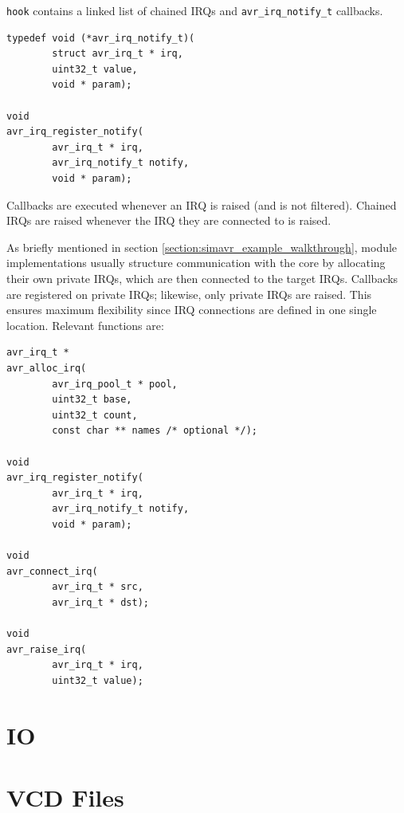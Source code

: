 \lstinline|hook| contains a linked list of chained \acp{IRQ} and
\lstinline|avr_irq_notify_t| callbacks.

\begin{lstlisting}
typedef void (*avr_irq_notify_t)(
        struct avr_irq_t * irq,
        uint32_t value,
        void * param);

void
avr_irq_register_notify(
        avr_irq_t * irq,
        avr_irq_notify_t notify,
        void * param);
\end{lstlisting}

Callbacks are executed whenever an \ac{IRQ} is raised (and is not filtered).
Chained \acp{IRQ} are raised whenever the \ac{IRQ} they are connected to is raised.

As briefly mentioned in section \ref{section:simavr_example_walkthrough}, module
implementations usually structure communication with the \simavr core by
allocating their own private \acp{IRQ}, which are then connected to the target
\simavr \acp{IRQ}. Callbacks are registered on private \acp{IRQ};
likewise, only private \acp{IRQ} are raised. This
ensures maximum flexibility since \ac{IRQ} connections are defined in one single
location. Relevant functions are:

\begin{lstlisting}
avr_irq_t *
avr_alloc_irq(
        avr_irq_pool_t * pool,
        uint32_t base,
        uint32_t count,
        const char ** names /* optional */);

void
avr_irq_register_notify(
        avr_irq_t * irq,
        avr_irq_notify_t notify,
        void * param);

void
avr_connect_irq(
        avr_irq_t * src,
        avr_irq_t * dst);

void
avr_raise_irq(
        avr_irq_t * irq,
        uint32_t value);
\end{lstlisting}


\section{\acf{IO}}



\section{\acf{VCD} Files}

